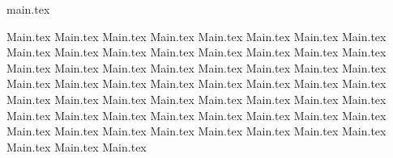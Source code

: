 \documentclass[addpoints, 12pt]{exam}
\begin{document}
{main.tex}

\newpage 

\tableofcontents

\newpage

{Main.tex}
\newpage
{Main.tex}
\newpage
{Main.tex}
\newpage
{Main.tex}
\newpage
{Main.tex}
\newpage
{Main.tex}
\newpage
{Main.tex}
\newpage
{Main.tex}
\newpage
{Main.tex}
\newpage
{Main.tex}
\newpage
{Main.tex}
\newpage
{Main.tex}
\newpage
{Main.tex}
\newpage
{Main.tex}
\newpage
{Main.tex}
\newpage
{Main.tex}
\newpage
{Main.tex}
\newpage
{Main.tex}
\newpage
{Main.tex}
\newpage
{Main.tex}
\newpage
{Main.tex}
\newpage
{Main.tex}
\newpage
{Main.tex}
\newpage
{Main.tex}
\newpage
{Main.tex}
\newpage
{Main.tex}
\newpage
{Main.tex}
\newpage
{Main.tex}
\newpage
{Main.tex}
\newpage
{Main.tex}
\newpage
{Main.tex}
\newpage
{Main.tex}
\newpage
{Main.tex}
\newpage
{Main.tex}
\newpage
{Main.tex}
\newpage
{Main.tex}
\newpage
{Main.tex}
\newpage
{Main.tex}
\newpage
{Main.tex}
\newpage
{Main.tex}
\newpage
{Main.tex}
\newpage
{Main.tex}
\newpage
{Main.tex}
\newpage
{Main.tex}
\newpage
{Main.tex}
\newpage
{Main.tex}
\newpage
{Main.tex}
\newpage
{Main.tex}
\newpage
{Main.tex}
\newpage
{Main.tex}
\newpage
{Main.tex}
\newpage
{Main.tex}
\newpage
{Main.tex}
\newpage
{Main.tex}
\newpage
{Main.tex}
\newpage
{Main.tex}
\newpage
{Main.tex}
\newpage
{Main.tex}
\newpage
{Main.tex}
\end{document}
